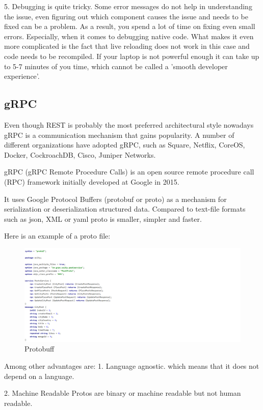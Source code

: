 5. Debugging is quite tricky. Some error messages do not help in understanding the issue, even figuring out which component causes the issue and needs to be fixed can be a problem.
As a result, you spend a lot of time on fixing even small errors. Especially, when it comes to debugging native code. What makes it even more complicated is the fact that live reloading does not work in this case and code needs to be recompiled. If your laptop is not powerful enough it can take up to 5-7 minutes of you time, which cannot be called a 'smooth developer experience'.

\subsection{gRPC}
\indent
\indent
Even though REST is probably the most preferred architectural style nowadays gRPC is a communication mechanism that gains popularity.
A number of different organizations have adopted gRPC, such as Square, Netflix, CoreOS, Docker, CockroachDB, Cisco, Juniper Networks.

gRPC (gRPC Remote Procedure Calls) is an open source remote procedure call (RPC) framework initially developed at Google in 2015\cite{wang1993grpc}.

It uses Google Protocol Buffers (protobuf or proto) as a mechanism for serialization or deserialization structured data. Compared to text-file formats such as json, XML or yaml proto is smaller, simpler and faster. 

Here is an example of a proto file:
\begin{figure}[ht]
    \centering
    \includegraphics[width=2\textwidth]{img/proto.png}
     \caption{Protobuff}
    \label{fig:Protobuff}
\end{figure}

Among other advantages are:
1. Language agnostic.
which means that it does not depend on a language.

2. Machine Readable
 Protos are binary or machine readable but not human readable.
 
